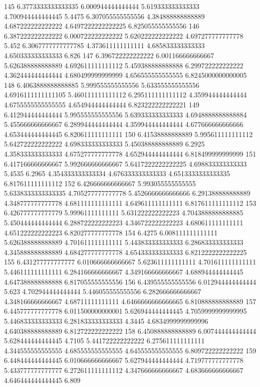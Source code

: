 145 6.3773333333333335 6.000944444444444 5.619333333333333 4.700944444444445 5.4475 6.307055555555556 4.384888888888889 4.687222222222222 4.6497222222222225 6.825055555555556
146 6.387222222222222 6.000722222222222 5.620222222222222 4.697277777777778 5.452 6.3067777777777785 4.373611111111111 4.685833333333333 4.650333333333333 6.826
147 6.396722222222222 6.001166666666667 5.626388888888889 4.692611111111112 5.459388888888888 6.299722222222222 4.362444444444444 4.680499999999999 4.656555555555555 6.8245000000000005
148 6.4063888888888885 5.999555555555556 5.633555555555556 4.6916111111111105 5.460111111111112 6.295111111111112 4.359944444444444 4.6755555555555555 4.654944444444444 6.823222222222221
149 6.412944444444444 5.995555555555556 5.639333333333333 4.6948888888888884 5.455666666666667 6.289944444444444 4.359944444444444 4.677666666666666 4.653444444444445 6.820611111111111
150 6.41538888888889 5.995611111111112 5.642722222222222 4.698333333333333 5.450388888888889 6.2925 4.358333333333333 4.675277777777778 4.652944444444444 6.818499999999999
151 6.417166666666667 5.992666666666667 5.6417222222222225 4.698833333333333 5.4535 6.2965 4.354333333333334 4.676333333333333 4.6513333333333335 6.817611111111112
152 6.426666666666667 5.993055555555555 5.6338333333333335 4.705277777777778 5.4526666666666666 6.291388888888889 4.348777777777778 4.681111111111111 4.649611111111111 6.817611111111112
153 6.426777777777779 5.99961111111111 5.631222222222223 4.7043888888888885 5.450444444444444 6.288722222222223 4.346722222222223 4.680611111111111 4.651222222222223 6.820277777777778
154 6.4275 6.008111111111111 5.626388888888889 4.701611111111111 5.443833333333333 6.286833333333333 4.345888888888889 4.684277777777778 4.654333333333333 6.8212222222222225
155 6.431277777777777 6.010666666666667 5.623611111111111 4.701611111111111 5.446111111111111 6.284166666666667 4.349166666666667 4.688944444444445 4.647388888888888 6.817055555555556
156 6.439555555555556 6.012944444444444 5.623 4.702944444444444 5.446055555555556 6.282666666666667 4.348166666666667 4.68711111111111 4.6466666666666665 6.810888888888889
157 6.445777777777778 6.011500000000001 5.626944444444445 4.7059999999999995 5.446833333333333 6.281833333333333 4.3445 4.6834999999999996 4.640388888888889 6.812722222222222
158 6.450888888888889 6.007444444444444 5.628444444444445 4.7105 5.441722222222222 6.275611111111111 4.344555555555555 4.685555555555555 4.645555555555555 6.809722222222222
159 6.448444444444445 6.010666666666667 5.627944444444444 4.719777777777778 5.433777777777777 6.272611111111112 4.347666666666667 4.683666666666667 4.646444444444445 6.809
